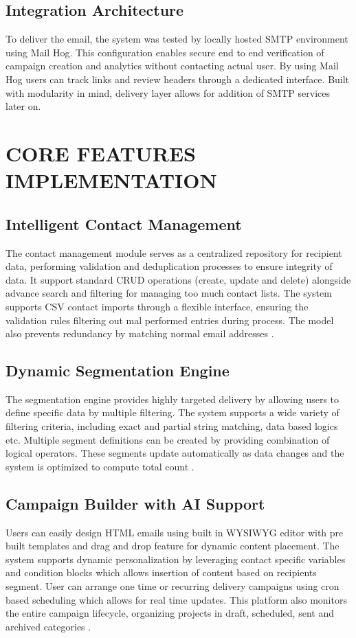 \documentclass[12pt,journal,compsoc]{IEEEtran}
\begin{document}
\subsection{Integration Architecture}
To deliver the email, the system was tested by locally hosted SMTP environment using Mail Hog. This configuration enables secure end to end verification of campaign creation and analytics without contacting actual user. By using Mail Hog users can track links and review headers through a dedicated interface. Built with modularity in mind, delivery layer allows for addition of SMTP services later on.

\section{CORE FEATURES IMPLEMENTATION}

\subsection{Intelligent Contact Management}
The contact management module serves as a centralized repository for recipient data, performing validation and deduplication processes to ensure integrity of data. It support standard CRUD operations (create, update and delete) alongside advance search and filtering for managing too much contact lists. The system supports CSV contact imports through a flexible interface, ensuring the validation rules filtering out mal performed entries during process. The model also prevents redundancy by matching normal email addresses \cite{ref5}.

\subsection{Dynamic Segmentation Engine}
The segmentation engine provides highly targeted delivery by allowing users to define specific data by multiple filtering. The system supports a wide variety of filtering criteria, including exact and partial string matching, data based logics etc. Multiple segment definitions can be created by providing combination of logical operators. These segments update automatically as data changes and the system is optimized to compute total count \cite{ref10}.

\subsection{Campaign Builder with AI Support}
Users can easily design HTML emails using built in WYSIWYG editor with pre built templates and drag and drop feature for dynamic content placement. The system supports dynamic personalization by leveraging contact specific variables and condition blocks which allows insertion of content based on recipients segment. User can arrange one time or recurring delivery campaigns using cron based scheduling which allows for real time updates. This platform also monitors the entire campaign lifecycle, organizing projects in draft, scheduled, sent and archived categories \cite{ref7}.
\end{document}
